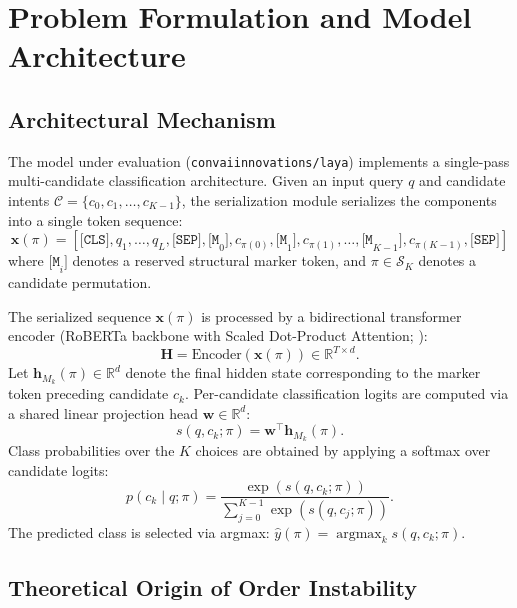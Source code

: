 \documentclass[10pt]{article}
\begin{document}
\section{Problem Formulation and Model Architecture}

\subsection{Architectural Mechanism}

The model under evaluation (\nolinkurl{convaiinnovations/laya}) implements a single-pass multi-candidate classification architecture. Given an input query $q$ and candidate intents $\mathcal{C} = \{c_0, c_1, \dots, c_{K-1}\}$, the serialization module serializes the components into a single token sequence:
\begin{equation}
\mathbf{x}(\pi) = \left[ \texttt{[CLS]}, q_1, \dots, q_L, \texttt{[SEP]}, \texttt{[M}_0\texttt{]}, c_{\pi(0)}, \texttt{[M}_1\texttt{]}, c_{\pi(1)}, \dots, \texttt{[M}_{K-1}\texttt{]}, c_{\pi(K-1)}, \texttt{[SEP]} \right]
\end{equation}
where $\texttt{[M}_i\texttt{]}$ denotes a reserved structural marker token, and $\pi \in \mathcal{S}_K$ denotes a candidate permutation.

The serialized sequence $\mathbf{x}(\pi)$ is processed by a bidirectional transformer encoder (RoBERTa backbone with Scaled Dot-Product Attention; \citealp{vaswani2017attention, liu2019roberta}):
\begin{equation}
\mathbf{H} = \text{Encoder}(\mathbf{x}(\pi)) \in \mathbb{R}^{T \times d}.
\end{equation}
Let $\mathbf{h}_{M_k}(\pi) \in \mathbb{R}^d$ denote the final hidden state corresponding to the marker token preceding candidate $c_k$. Per-candidate classification logits are computed via a shared linear projection head $\mathbf{w} \in \mathbb{R}^d$:
\begin{equation}
s(q, c_k; \pi) = \mathbf{w}^\top \mathbf{h}_{M_k}(\pi).
\end{equation}
Class probabilities over the $K$ choices are obtained by applying a softmax over candidate logits:
\begin{equation}
p(c_k \mid q; \pi) = \frac{\exp(s(q, c_k; \pi))}{\sum_{j=0}^{K-1} \exp(s(q, c_j; \pi))}.
\end{equation}
The predicted class is selected via argmax: $\hat{y}(\pi) = \operatorname*{argmax}_{k} s(q, c_k; \pi)$.

\subsection{Theoretical Origin of Order Instability}
\end{document}
